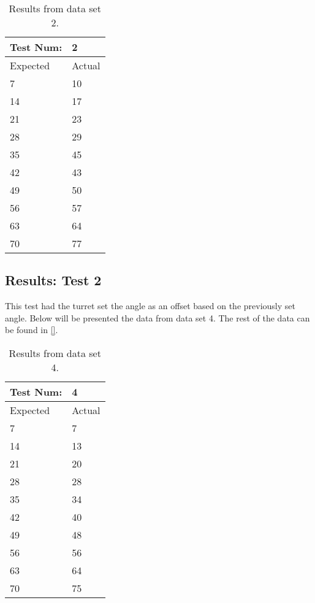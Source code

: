 \begin{table}[]
\centering
\begin{tabular}{ll}
Test Num:                     & 2      \\ \hline
\multicolumn{1}{l|}{Expected} & Actual \\ \hline
\multicolumn{1}{l|}{7}        & 10     \\
\multicolumn{1}{l|}{14}       & 17     \\
\multicolumn{1}{l|}{21}       & 23     \\
\multicolumn{1}{l|}{28}       & 29     \\
\multicolumn{1}{l|}{35}       & 45     \\
\multicolumn{1}{l|}{42}       & 43     \\
\multicolumn{1}{l|}{49}       & 50     \\
\multicolumn{1}{l|}{56}       & 57     \\
\multicolumn{1}{l|}{63}       & 64     \\
\multicolumn{1}{l|}{70}       & 77
\end{tabular}
\caption{Results from data set 2.}
\label{AngleTest1Result}
\end{table}

\subsection{Results: Test 2}
This test had the turret set the angle as an offset based on the previously set
angle. Below will be presented the data from data set 4.
The rest of the data can be found in \autoref{}.

\begin{table}[]
\centering
\begin{tabular}{ll}
Test Num:                     & 4      \\ \hline
\multicolumn{1}{l|}{Expected} & Actual \\ \hline
\multicolumn{1}{l|}{7}        & 7     \\
\multicolumn{1}{l|}{14}       & 13     \\
\multicolumn{1}{l|}{21}       & 20     \\
\multicolumn{1}{l|}{28}       & 28     \\
\multicolumn{1}{l|}{35}       & 34     \\
\multicolumn{1}{l|}{42}       & 40     \\
\multicolumn{1}{l|}{49}       & 48     \\
\multicolumn{1}{l|}{56}       & 56     \\
\multicolumn{1}{l|}{63}       & 64     \\
\multicolumn{1}{l|}{70}       & 75
\end{tabular}
\caption{Results from data set 4.}
\label{AngleTest1Result}
\end{table}
